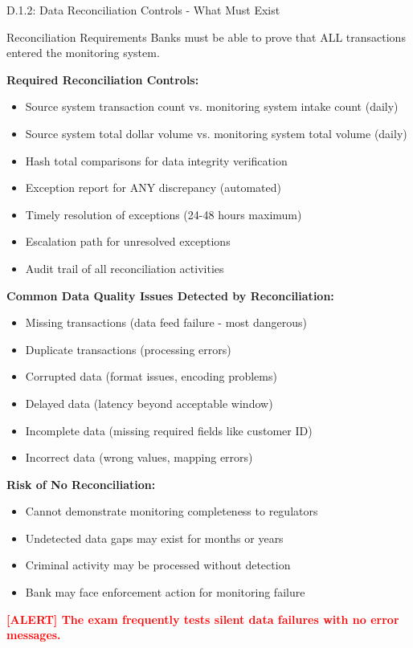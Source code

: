 \documentclass[11pt,a4paper]{beamer}
\newcommand{\redflag}[1]{\textcolor{red}{\textbf{[ALERT] #1}}}
\begin{document}
\begin{frame}{D.1.2: Data Reconciliation Controls - What Must Exist}
	\begin{block}{Reconciliation Requirements}
		Banks must be able to prove that ALL transactions entered the monitoring system.
	\end{block}
	\textbf{Required Reconciliation Controls:}
	\begin{itemize}
		\item Source system transaction count vs. monitoring system intake count (daily)
		\item Source system total dollar volume vs. monitoring system total volume (daily)
		\item Hash total comparisons for data integrity verification
		\item Exception report for ANY discrepancy (automated)
		\item Timely resolution of exceptions (24-48 hours maximum)
		\item Escalation path for unresolved exceptions
		\item Audit trail of all reconciliation activities
	\end{itemize}
	\textbf{Common Data Quality Issues Detected by Reconciliation:}
	\begin{itemize}
		\item Missing transactions (data feed failure - most dangerous)
		\item Duplicate transactions (processing errors)
		\item Corrupted data (format issues, encoding problems)
		\item Delayed data (latency beyond acceptable window)
		\item Incomplete data (missing required fields like customer ID)
		\item Incorrect data (wrong values, mapping errors)
	\end{itemize}
	\textbf{Risk of No Reconciliation:}
	\begin{itemize}
		\item Cannot demonstrate monitoring completeness to regulators
		\item Undetected data gaps may exist for months or years
		\item Criminal activity may be processed without detection
		\item Bank may face enforcement action for monitoring failure
	\end{itemize}
	\redflag{The exam frequently tests silent data failures with no error messages.}
\end{frame}
\end{document}
